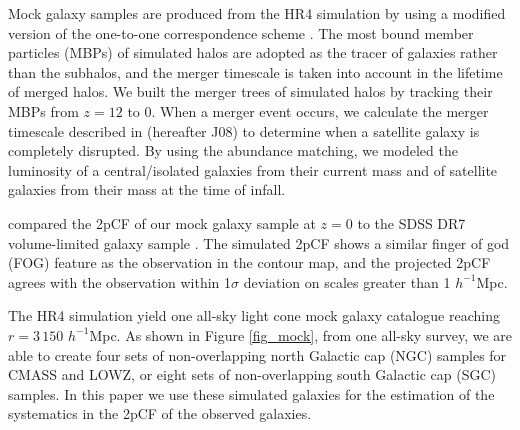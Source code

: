 \documentclass[iop]{emulateapj}
\begin{document}
Mock galaxy samples are produced from the HR4 simulation by using a modified version of the one-to-one correspondence scheme \citep{hong2016}. 
The most bound member particles (MBPs) of simulated halos are adopted as the tracer of galaxies rather than the subhalos,
and the merger timescale is taken into account in the lifetime of merged halos.
We built the merger trees of simulated halos by tracking their MBPs from $z = 12$ to 0.
When a merger event occurs, we calculate the merger timescale described in \cite{jiang2008} (hereafter J08)
to determine when a satellite galaxy is completely disrupted.
By using the abundance matching, 
we modeled the luminosity of a central/isolated galaxies from their current mass
and of satellite galaxies 
from their mass at the time of infall.

\cite{hong2016} compared the 2pCF of our mock galaxy sample at $z = 0$ to the SDSS DR7 volume-limited galaxy sample \citep{zehavi2011}.
The simulated 2pCF shows a similar finger of god (FOG) feature \citep{FOG} as the observation in the contour map, 
and the projected 2pCF agrees with the observation within 1$\sigma$ deviation on scales greater than 1 ${h^{-1}}$Mpc.


The HR4 simulation yield one all-sky light cone mock galaxy catalogue reaching $r=3\,150$ ${h^{-1}}$Mpc.
As shown in Figure \ref{fig_mock},
from one all-sky survey, 
we are able to create four sets of non-overlapping north Galactic cap (NGC) samples for CMASS and LOWZ, 
or eight sets of non-overlapping south Galactic cap (SGC) samples.
In this paper we use these simulated galaxies for the estimation of the systematics in the 2pCF of the observed galaxies.
\end{document}
